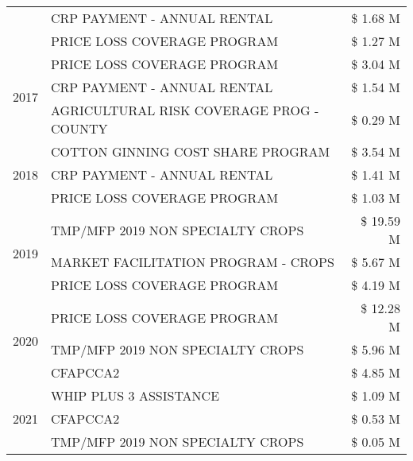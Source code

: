 \begin{tabular}{llr}
 & CRP PAYMENT - ANNUAL RENTAL & \$ 1.68 M \\
 & PRICE LOSS COVERAGE PROGRAM & \$ 1.27 M \\
\cline{1-3}
\multirow[t]{3}{*}{2017} & PRICE LOSS COVERAGE PROGRAM & \$ 3.04 M \\
 & CRP PAYMENT - ANNUAL RENTAL & \$ 1.54 M \\
 & AGRICULTURAL RISK COVERAGE PROG - COUNTY & \$ 0.29 M \\
\cline{1-3}
\multirow[t]{3}{*}{2018} & COTTON GINNING COST SHARE PROGRAM & \$ 3.54 M \\
 & CRP PAYMENT - ANNUAL RENTAL & \$ 1.41 M \\
 & PRICE LOSS COVERAGE PROGRAM & \$ 1.03 M \\
\cline{1-3}
\multirow[t]{3}{*}{2019} & TMP/MFP 2019 NON SPECIALTY CROPS & \$ 19.59 M \\
 & MARKET FACILITATION PROGRAM - CROPS & \$ 5.67 M \\
 & PRICE LOSS COVERAGE PROGRAM & \$ 4.19 M \\
\cline{1-3}
\multirow[t]{3}{*}{2020} & PRICE LOSS COVERAGE PROGRAM & \$ 12.28 M \\
 & TMP/MFP 2019 NON SPECIALTY CROPS & \$ 5.96 M \\
 & CFAPCCA2 & \$ 4.85 M \\
\cline{1-3}
\multirow[t]{3}{*}{2021} & WHIP PLUS 3 ASSISTANCE & \$ 1.09 M \\
 & CFAPCCA2 & \$ 0.53 M \\
 & TMP/MFP 2019 NON SPECIALTY CROPS & \$ 0.05 M \\
\cline{1-3}
\bottomrule
\end{tabular}
